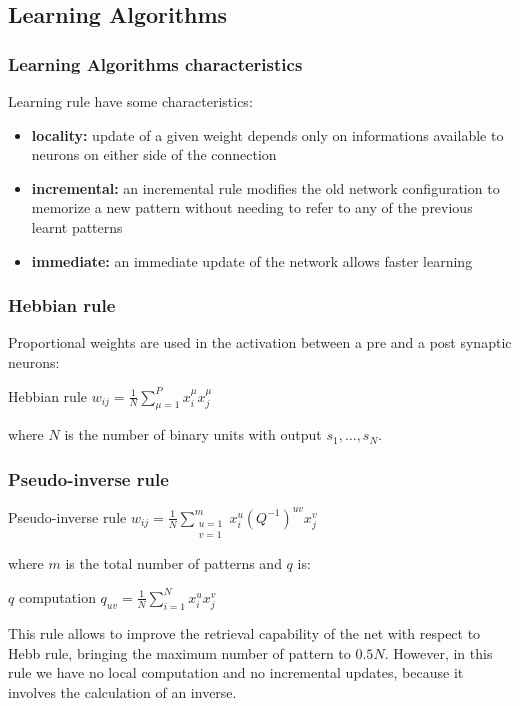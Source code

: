 \documentclass{beamer}
\begin{document}

\subsection{Learning Algorithms}

\begin{frame}
\frametitle{Learning Algorithms characteristics}
Learning rule have some characteristics:
\begin{itemize}
\item\textbf{locality:} update of a given weight depends only on informations available to neurons on either side of the connection
\item\textbf{incremental:} an incremental rule modifies the old network configuration to memorize a new pattern without needing to refer to any of the previous learnt patterns
\item\textbf{immediate:} an immediate update of the network allows faster learning
\end{itemize}
\end{frame}



\begin{frame}
\frametitle{Hebbian rule}
Proportional weights are used in the activation between a pre and a post synaptic neurons:
\begin{block}{Hebbian rule}
$w_{ij} = \frac{1}{N} \sum_{\mu = 1}^P x_i^\mu x_j^\mu$
\end{block}
where $N$ is the number of binary units with output $s_1,\ldots,s_N$.
\end{frame}


\begin{frame}
\frametitle{Pseudo-inverse rule}
\begin{block}{Pseudo-inverse rule}
$w_{ij} = \frac{1}{N} \sum_{\substack{u=1\\v=1    }}^m x_i^u (Q^{-1})^{uv} x_j^v$
\end{block}
where $m$ is the total number of patterns and $q$ is:
\begin{block}{$q$ computation}
$q_{uv} = \frac{1}{N} \sum_{i=1}^N x_i^u x_j^v$
\end{block}
This rule allows to improve the retrieval capability of the net with respect to Hebb rule, bringing the maximum number of pattern to $0.5N$. However, in this rule we have no local computation and no incremental updates, because it involves the calculation of an inverse.
\end{frame}
\end{document}
